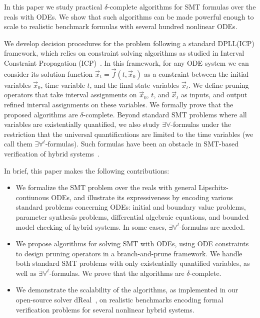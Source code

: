 \documentclass[11pt]{article}
\begin{document}
In this paper we study practical $\delta$-complete algorithms for SMT formulas over the reals with ODEs. We show that such algorithms can be made powerful enough to scale to realistic benchmark formulas with several hundred nonlinear ODEs.

We develop decision procedures for the problem following a standard DPLL(ICP) framework, which relies on constraint solving algorithms as studied in Interval Constraint Propagation (ICP)~\cite{handbookICP}. In this framework, for any ODE system we can consider its solution function $\vec x_t = \vec f(t, \vec x_0)$ as a constraint between the initial variables $\vec x_0$, time variable $t$, and the final state variables $\vec x_t$. We define pruning operators that take interval assignments on $\vec x_0$, $t$, and $\vec x_t$ as inputs, and output refined interval assignments on these variables. We formally prove that the proposed algorithms are $\delta$-complete. Beyond standard SMT problems where all variables are existentially quantified, we also study $\exists\forall$-formulas under the restriction that the universal quantifications are limited to the time variables (we call them $\exists\forall^t$-formulas). Such formulas have been an obstacle in SMT-based verification of hybrid systems~\cite{DBLP:conf/fmcad/CimattiMT12,DBLP:conf/aaai/CimattiMT12}. 

In brief, this paper makes the following contributions:

\begin{itemize}
\item We formalize the SMT problem over the reals with general Lipschitz-contiunous ODEs, and illustrate its expressiveness by encoding various standard problems concerning ODEs: initial and boundary value problems, parameter synthesis problems, differential algebraic equations, and bounded model checking of hybrid systems. In some cases, $\exists\forall^t$-formulas are needed.
\item We propose algorithms for solving SMT with ODEs, using ODE constraints to design pruning operators in a branch-and-prune framework. We handle both standard SMT problems with only existentially quantified variables, as well as $\exists\forall^t$-formulas. We prove that the algorithms are $\delta$-complete.
\item We demonstrate the scalability of the algorithms, as implemented in our open-source solver {\sf dReal}~\cite{DBLP:conf/cade/GaoKC13}, on realistic benchmarks encoding formal verification problems for several nonlinear hybrid systems.
\end{itemize}
\end{document}
